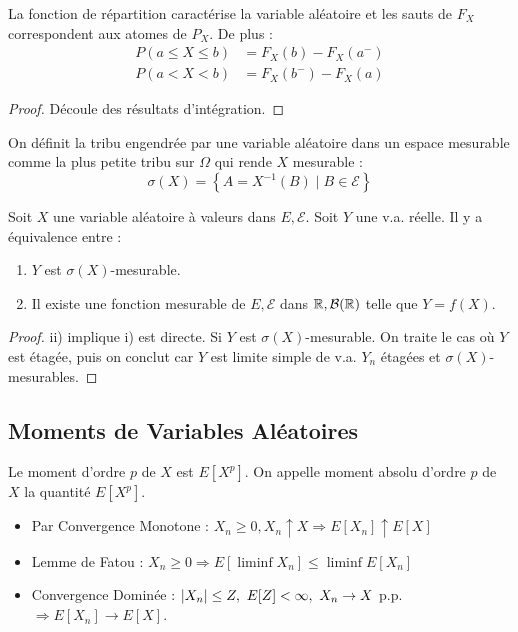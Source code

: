 \documentclass{cours}
\begin{document}
\begin{proposition}
    La fonction de répartition caractérise la variable aléatoire et les sauts de $F_{X}$ correspondent aux atomes de $P_{X}$. De plus :
    \[
        \begin{aligned}
            P\left(a \leq X \leq b\right) & = F_{X}(b) - F_{X}(a^{-}) \\
            P\left(a < X < b\right)       & = F_{X}(b^{-}) - F_{X}(a)
        \end{aligned}
    \]
\end{proposition}
\begin{proof}
    Découle des résultats d'intégration.
\end{proof}

\begin{definition}
    On définit la tribu engendrée par une variable aléatoire dans un espace mesurable comme la plus petite tribu sur $\Omega$ qui rende $X$ mesurable :
    \[
        \sigma(X) = \left\{A = X^{-1}(B)\mid B\in \mathcal{E}\right\}
    \]
\end{definition}

\begin{proposition}
    Soit $X$ une variable aléatoire à valeurs dans $E, \mathcal{E}$. Soit $Y$ une v.a. réelle. Il y a équivalence entre :
    \begin{enumerate}
        \item $Y$ est $\sigma(X)$-mesurable.
        \item Il existe une fonction mesurable de $E, \mathcal{E}$ dans $\mathbb{R}, \mathcal{B}(\mathbb{R})$ telle que $Y = f(X)$.
    \end{enumerate}
\end{proposition}
\begin{proof}
    ii) implique i) est directe. Si $Y$ est $\sigma(X)$-mesurable. On traite le cas où $Y$ est étagée, puis on conclut car $Y$ est limite simple de v.a. $Y_{n}$ étagées et $\sigma(X)$-mesurables.
\end{proof}

\subsection{Moments de Variables Aléatoires}
\begin{definition}
    Le moment d'ordre $p$ de $X$ est $E[X^{p}]$. On appelle moment absolu d'ordre $p$ de $X$ la quantité $E\left[X^{p}\right]$.
\end{definition}

\begin{proposition}
    \begin{itemize}
        \item Par Convergence Monotone : $X_{n} \geq 0, X_{n} \uparrow X \Rightarrow E[X_{n}] \uparrow E[X]$
        \item Lemme de Fatou : $X_{n} \geq 0 \Rightarrow E[\liminf X_{n}] \leq \liminf E[X_{n}]$
        \item Convergence Dominée : $\left|X_{n}\right| \leq Z, \ E[Z] < \infty, \ X_{n} \rightarrow X$ p.p. $\Rightarrow E[X_{n}] \rightarrow E[X]$.
    \end{itemize}
\end{proposition}
\end{document}
